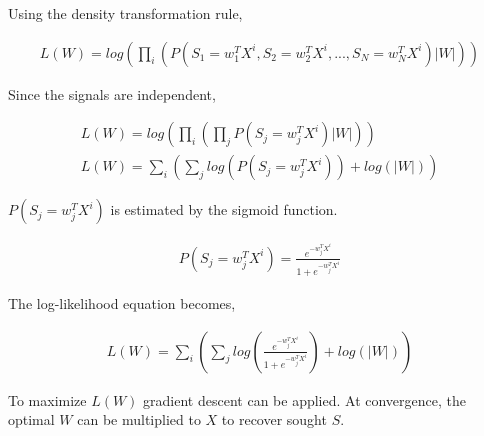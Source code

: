 \documentclass[11pt, a4paper]{article}
\begin{document}
Using the density transformation rule,

\begin{align*}
	L(W) = log \left( \prod_i \left( P(S_1 = w_1^{T} X^i, S_2=w_2^{T} X^i, ..., S_N= w_N^{T} X^i) |W| \right) \right) 
\end{align*}

Since the signals are independent,

\begin{align*}
	L(W)= log \left( \prod_i \left( \prod_j  P(S_j = w_j^{T}X^i) |W| \right) \right) \\
	L(W) = \sum_i \left( \sum_j  log (P(S_j = w_j^{T}X^i)) + log(|W|) \right)        
\end{align*}

$P(S_j = w_j^{T}X^i)$ is estimated by the sigmoid function.

\begin{align*}
	P(S_j = w_j^{T}X^i) = \frac{e^{-w_j^{T}X^i}}{1 + e^{-w_j^{T}X^i}} 
\end{align*}

The log-likelihood equation becomes,

\begin{align*}
	L(W) = \sum_i \left( \sum_j  log \left( \frac{e^{-w_j^{T}X^i}}{1 + e^{-w_j^{T}X^i}} \right) + log(|W|) \right) 
\end{align*}

To maximize $L(W)$ gradient descent can be applied. At convergence, the optimal $W$ can be multiplied to $X$ to recover sought $S$.  
\end{document}
